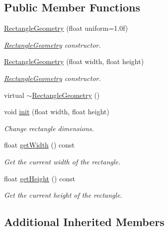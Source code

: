 \subsection*{Public Member Functions}
\begin{DoxyCompactItemize}
\item 
\mbox{\hyperlink{classec_1_1_rectangle_geometry_a32727c2f9bca52cec764627b9a5c27ec}{Rectangle\+Geometry}} (float uniform=1.\+0f)
\begin{DoxyCompactList}\small\item\em \mbox{\hyperlink{classec_1_1_rectangle_geometry}{Rectangle\+Geometry}} constructor. \end{DoxyCompactList}\item 
\mbox{\hyperlink{classec_1_1_rectangle_geometry_aa1b327fbb455fe591c75b035882695cf}{Rectangle\+Geometry}} (float width, float height)
\begin{DoxyCompactList}\small\item\em \mbox{\hyperlink{classec_1_1_rectangle_geometry}{Rectangle\+Geometry}} constructor. \end{DoxyCompactList}\item 
virtual \mbox{\hyperlink{classec_1_1_rectangle_geometry_ade8488c66850e8c5e858889dc9b266d8}{$\sim$\+Rectangle\+Geometry}} ()
\item 
void \mbox{\hyperlink{classec_1_1_rectangle_geometry_ac6dd804a2fa2b253b71408dae5a08265}{init}} (float width, float height)
\begin{DoxyCompactList}\small\item\em Change rectangle dimensions. \end{DoxyCompactList}\item 
float \mbox{\hyperlink{classec_1_1_rectangle_geometry_a1f75cd7d531e23fe3ccaff67178e0a08}{get\+Width}} () const
\begin{DoxyCompactList}\small\item\em Get the current width of the rectangle. \end{DoxyCompactList}\item 
float \mbox{\hyperlink{classec_1_1_rectangle_geometry_a54989d6e1a08afb8f327bd06a4c2e93b}{get\+Height}} () const
\begin{DoxyCompactList}\small\item\em Get the current height of the rectangle. \end{DoxyCompactList}\end{DoxyCompactItemize}
\subsection*{Additional Inherited Members}


